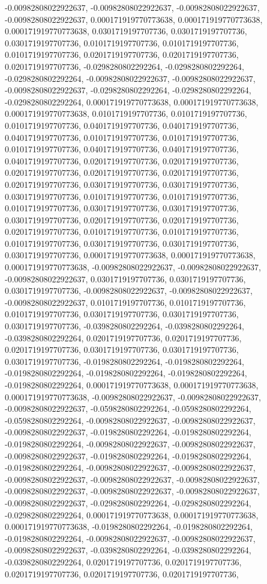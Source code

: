 \documentclass[
  ,man]{apa6}
\begin{document}
-0.00982808022922637, -0.00982808022922637, -0.00982808022922637, -0.00982808022922637, 0.000171919770773638, 0.000171919770773638, 0.000171919770773638, 0.0301719197707736, 0.0301719197707736, 0.0301719197707736, 0.0101719197707736, 0.0101719197707736, 0.0101719197707736, 0.0201719197707736, 0.0201719197707736, 0.0201719197707736, -0.0298280802292264, -0.0298280802292264, -0.0298280802292264, -0.00982808022922637, -0.00982808022922637, -0.00982808022922637, -0.0298280802292264, -0.0298280802292264,
-0.0298280802292264, 0.000171919770773638, 0.000171919770773638, 0.000171919770773638, 0.0101719197707736, 0.0101719197707736, 0.0101719197707736, 0.0401719197707736, 0.0401719197707736, 0.0401719197707736, 0.0101719197707736, 0.0101719197707736, 0.0101719197707736, 0.0401719197707736, 0.0401719197707736, 0.0401719197707736, 0.0201719197707736, 0.0201719197707736, 0.0201719197707736, 0.0201719197707736, 0.0201719197707736, 0.0201719197707736, 0.0301719197707736, 0.0301719197707736, 0.0301719197707736,
0.0101719197707736, 0.0101719197707736, 0.0101719197707736, 0.0301719197707736, 0.0301719197707736, 0.0301719197707736, 0.0201719197707736, 0.0201719197707736, 0.0201719197707736, 0.0101719197707736, 0.0101719197707736, 0.0101719197707736, 0.0301719197707736, 0.0301719197707736, 0.0301719197707736, 0.000171919770773638, 0.000171919770773638, 0.000171919770773638, -0.00982808022922637, -0.00982808022922637, -0.00982808022922637, 0.0301719197707736, 0.0301719197707736, 0.0301719197707736, -0.00982808022922637,
-0.00982808022922637, -0.00982808022922637, 0.0101719197707736, 0.0101719197707736, 0.0101719197707736, 0.0301719197707736, 0.0301719197707736, 0.0301719197707736, -0.0398280802292264, -0.0398280802292264, -0.0398280802292264, 0.0201719197707736, 0.0201719197707736, 0.0201719197707736, 0.0301719197707736, 0.0301719197707736, 0.0301719197707736, -0.0198280802292264, -0.0198280802292264, -0.0198280802292264, -0.0198280802292264, -0.0198280802292264, -0.0198280802292264, 0.000171919770773638, 0.000171919770773638,
0.000171919770773638, -0.00982808022922637, -0.00982808022922637, -0.00982808022922637, -0.0598280802292264, -0.0598280802292264, -0.0598280802292264, -0.00982808022922637, -0.00982808022922637, -0.00982808022922637, -0.0198280802292264, -0.0198280802292264, -0.0198280802292264, -0.00982808022922637, -0.00982808022922637, -0.00982808022922637, -0.0198280802292264, -0.0198280802292264, -0.0198280802292264, -0.00982808022922637, -0.00982808022922637, -0.00982808022922637, -0.00982808022922637, -0.00982808022922637,
-0.00982808022922637, -0.00982808022922637, -0.00982808022922637, -0.00982808022922637, -0.0298280802292264, -0.0298280802292264, -0.0298280802292264, 0.000171919770773638, 0.000171919770773638, 0.000171919770773638, -0.0198280802292264, -0.0198280802292264, -0.0198280802292264, -0.00982808022922637, -0.00982808022922637, -0.00982808022922637, -0.0398280802292264, -0.0398280802292264, -0.0398280802292264, 0.0201719197707736, 0.0201719197707736, 0.0201719197707736, 0.0201719197707736, 0.0201719197707736,
\end{document}
